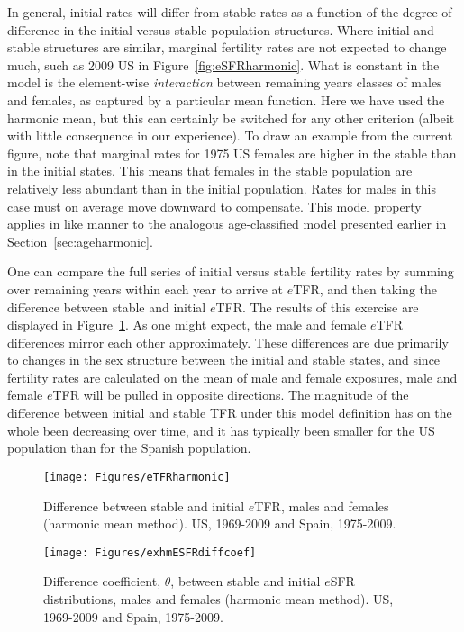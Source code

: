 In general, initial rates will differ from stable rates as a function of the
degree of difference in the initial versus stable population structures. Where
initial and stable structures are similar, marginal fertility rates are not
expected to change much, such as 2009 US in Figure~\ref{fig:eSFRharmonic}. What
is constant in the model is the element-wise \textit{interaction} between
remaining years classes of males and females, as captured by a particular mean function.
Here we have used the harmonic mean, but
this can certainly be switched for any other criterion (albeit with little
consequence in our experience). To draw an example from the current figure, note
that marginal rates for 1975 US females are higher in the stable than in the
initial states. This means that females in the stable population are relatively
less abundant than in the initial population. Rates for males in this case must
on average move downward to compensate. This model property applies in like 
manner to the analogous age-classified model
presented earlier in Section~\ref{sec:ageharmonic}.

One can compare the full series of initial versus stable fertility rates by
summing over remaining years within each year to arrive at $e$TFR, and then
taking the difference between stable and initial $e$TFR. The results of this
exercise are displayed in Figure~\ref{fig:eTFRharmonic}. As one might expect,
the male and female $e$TFR differences mirror each other approximately. These
differences are due primarily to changes in the sex structure between the initial and stable
states, and since fertility rates are calculated on the mean of male and female
exposures, male and female $e$TFR will be pulled in opposite directions. The
magnitude of the difference between initial and stable TFR under this model
definition has on the whole been decreasing over time, and it has typically been
smaller for the US population than for the Spanish population.

\begin{figure}[ht!]
        \centering  
          \caption{Difference between stable and initial $e$TFR, males and
          females (harmonic mean method). US, 1969-2009 and Spain,
          1975-2009.}
           \texttt{[image: Figures/eTFRharmonic]}
          \label{fig:eTFRharmonic}
\end{figure}




\begin{figure}[ht!]
        \centering  
          \caption{Difference coefficient, $\theta$, between stable and initial
          $e$SFR distributions, males and females (harmonic mean method). US, 1969-2009
          and Spain, 1975-2009.}
           \texttt{[image: Figures/exhmESFRdiffcoef]}
          \label{fig:exhmESFRdiffcoef}
\end{figure}

\FloatBarrier